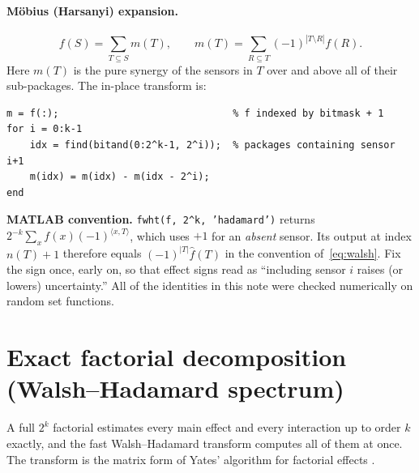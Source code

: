 \documentclass[11pt]{article}
\newcommand{\fh}{\widehat{f}}
\begin{document}
\paragraph{M\"obius (Harsanyi) expansion.}
\begin{equation}\label{eq:mobius}
  f(S)=\sum_{T\subseteq S}m(T),\qquad
  m(T)=\sum_{R\subseteq T}(-1)^{|T\setminus R|}f(R).
\end{equation}
Here $m(T)$ is the pure synergy of the sensors in $T$ over and above all of their sub-packages.
The in-place transform is:
\begin{lstlisting}
m = f(:);                              % f indexed by bitmask + 1
for i = 0:k-1
    idx = find(bitand(0:2^k-1, 2^i));  % packages containing sensor i+1
    m(idx) = m(idx) - m(idx - 2^i);
end
\end{lstlisting}

\noindent
\textbf{MATLAB convention.}
\texttt{fwht(f, 2\textasciicircum k, 'hadamard')} returns $2^{-k}\sum_x f(x)(-1)^{\langle x,T\rangle}$, which uses $+1$ for an \emph{absent} sensor.
Its output at index $n(T)+1$ therefore equals $(-1)^{|T|}\fh(T)$ in the convention of~\eqref{eq:walsh}.
Fix the sign once, early on, so that effect signs read as ``including sensor $i$ raises (or lowers) uncertainty.''
All of the identities in this note were checked numerically on random set functions.

\section{Exact factorial decomposition (Walsh--Hadamard spectrum)}\label{sec:walsh}

A full $2^k$ factorial estimates every main effect and every interaction up to order $k$ exactly, and the fast Walsh--Hadamard transform computes all of them at once.
The transform is the matrix form of Yates' algorithm for factorial effects \parencite{Yates1937,FinoAlgazi1976}.
\end{document}
